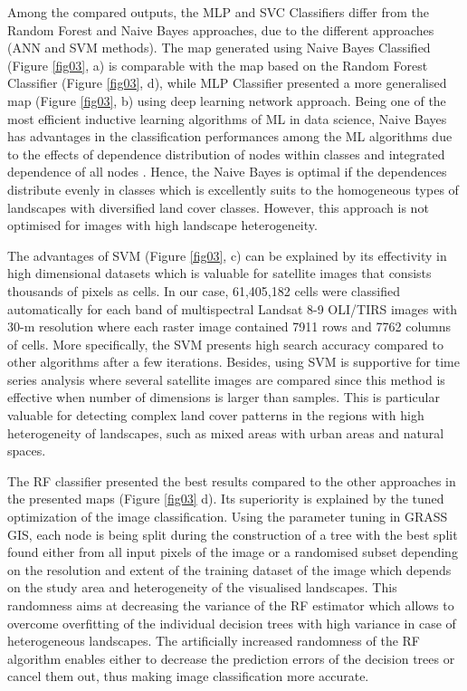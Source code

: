 \documentclass[final,5p,times,twocolumn]{elsarticle}
\begin{document}
Among the compared outputs, the MLP and SVC Classifiers differ from the Random Forest and Naive Bayes approaches, due to the different approaches (ANN and SVM methods). The map generated using Naive Bayes Classified (Figure \ref{fig03}, a) is comparable with the map based on the Random Forest Classifier (Figure \ref{fig03}, d), while MLP Classifier presented a more generalised map (Figure \ref{fig03}, b) using deep learning network approach. 
Being one of the most efficient inductive learning algorithms of ML in data science, Naive Bayes has advantages in the classification performances among the ML algorithms due to the effects of dependence distribution of nodes within classes and integrated  dependence of all nodes \cite{Zhang2004TheOO}. Hence, the Naive Bayes is optimal if the dependences distribute evenly in classes which is excellently suits to the homogeneous types of landscapes with diversified land cover classes. However, this approach is not optimised for images with high landscape heterogeneity.

The advantages of SVM (Figure \ref{fig03}, c) can be explained by its effectivity in high dimensional datasets which is valuable for satellite images that consists thousands of pixels as cells. In our case, 61,405,182 cells were classified automatically for each band of multispectral Landsat 8-9 OLI/TIRS images with 30-m resolution where each raster image contained 7911 rows and 7762 columns of cells. More specifically, the SVM presents high search accuracy compared to other algorithms after a few iterations. Besides, using SVM is supportive for time series analysis where several satellite images are compared since this method is effective when number of dimensions is larger than samples. This is particular valuable for detecting complex land cover patterns in the regions with high heterogeneity of landscapes, such as mixed areas with urban areas and natural spaces. 

The RF classifier presented the best results compared to the other approaches in the presented maps (Figure \ref{fig03} d). Its superiority is explained by the tuned optimization of the image classification. Using the parameter tuning in GRASS GIS, each node is being split during the construction of a tree with the best split found either from all input pixels of the image or a randomised subset depending on the resolution and extent of the training dataset of the image which depends on the study area and heterogeneity of the visualised landscapes. This randomness aims at decreasing the variance of the RF estimator which allows to overcome overfitting of the individual decision trees with high variance in case of heterogeneous landscapes. The artificially increased randomness of the RF algorithm enables either to decrease the prediction errors of the decision trees or cancel them out, thus making image classification more accurate.
\end{document}
